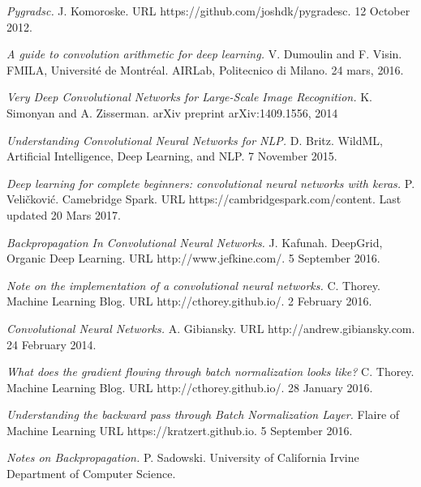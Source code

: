 \documentclass[a4paper, twoside]{article}
\begin{document}
\begin{thebibliography}{99}
	\textit{Pygradsc.}
	J. Komoroske.
	URL https://github.com/joshdk/pygradesc.
	12 October 2012.    
   
	\textit{A guide to convolution arithmetic for deep learning.}
    V. Dumoulin  and F. Visin.
    FMILA, Université de Montréal. AIRLab, Politecnico di Milano.
	24 mars, 2016.
	
	\textit{Very Deep Convolutional Networks for Large-Scale Image Recognition.}
	K. Simonyan and
    A. Zisserman.
    arXiv preprint arXiv:1409.1556, 2014
    
    



	
	\textit{Understanding Convolutional Neural Networks for NLP.}
	D. Britz.
	WildML, Artificial Intelligence, Deep Learning, and NLP.
	7 November 2015.
	
	
	
	\textit{Deep learning for complete beginners: convolutional neural networks with keras.}
	P. Veličković.
	Camebridge Spark. 
	URL https://cambridgespark.com/content.
	Last updated 20 Mars 2017.
	
	    
	\textit{Backpropagation In Convolutional Neural Networks.}
	J. Kafunah.
    DeepGrid, Organic Deep Learning. 
    URL http://www.jefkine.com/.
	5 September 2016.
	
	
	\textit{Note on the implementation of a convolutional neural networks.}
	C. Thorey.
    Machine Learning Blog. 
    URL http://cthorey.github.io/.
	2 February 2016.
	
	
	
	\textit{Convolutional Neural Networks.}
	A. Gibiansky.
    URL http://andrew.gibiansky.com.
	24 February 2014.
	
	
	

	
	\textit{What does the gradient flowing through batch normalization looks like?}
	C. Thorey.
    Machine Learning Blog. 
    URL http://cthorey.github.io/.
	28 January 2016.
	
	

	
	\textit{Understanding the backward pass through Batch Normalization Layer.}
	Flaire of Machine Learning
    URL https://kratzert.github.io.
	5 September 2016.

	\textit{Notes on Backpropagation.}
    P. Sadowski.
    University of California Irvine	Department of Computer Science.
    



\end{thebibliography}
\end{document}
